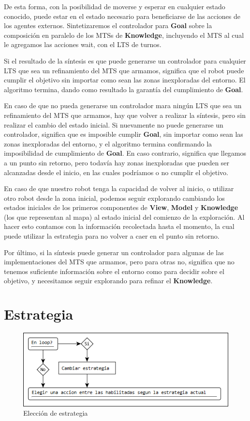 De esta forma, con la posibilidad de moverse y esperar en cualquier estado conocido, puede estar en el estado necesario para beneficiarse de las acciones de 
los agentes externos. Sintetizaremos el controlador para \textbf{Goal} sobre la composición en paralelo de los MTSs de \textbf{Knowledge}, incluyendo el MTS al 
cual le agregamos las acciones wait, con el LTS de turnos.


Si el resultado de la síntesis es que puede generarse un controlador para cualquier LTS que sea un refinamiento del MTS que armamos, significa que el robot 
puede cumplir el objetivo sin importar como sean las zonas inexploradas del entorno. El algoritmo termina, dando como resultado la garantía del cumplimiento 
de \textbf{Goal}.


En caso de que no pueda generarse un controlador mara ningún LTS que sea un refinamiento del MTS que armamos, hay que volver a realizar la síntesis, pero sin 
realizar el cambio del estado inicial. Si nuevamente no puede generarse un controlador, significa que es imposible cumplir \textbf{Goal}, sin importar como sean 
las zonas inexploradas del entorno, y el algoritmo termina confirmando la imposibilidad de cumplimiento de \textbf{Goal}. En caso contrario, significa que 
llegamos a un punto sin retorno, pero todavía hay zonas inexploradas que pueden ser alcanzadas desde el inicio, en las cuales podríamos o no cumplir el objetivo. 


En caso de que nuestro robot tenga la capacidad de volver al inicio, o utilizar otro robot desde la zona inicial, podemos seguir explorando cambiando los 
estados iniciales de los primeros componentes de \textbf{View}, \textbf{Model} y \textbf{Knowledge} (los que representan al mapa) al estado inicial del comienzo 
de la exploración. Al hacer esto contamos con la información recolectada hasta el momento, la cual puede utilizar la estrategia para no volver a caer en el 
punto sin retorno.


Por último, si la síntesis puede generar un controlador para algunas de las implementaciones del MTS que armamos, pero para otras no, significa que no tenemos 
suficiente información sobre el entorno como para decidir sobre el objetivo, y necesitamos seguir explorando para refinar el \textbf{Knowledge}.

\section{Estrategia}

\begin{figure}[H]
  \centering
    \includegraphics[scale=0.75]{Imagenes/Algoritmo/Algoritmo_elegir_1.png}
  \caption{Elección de estrategia}
  \label{fig:Algoritmo_elegir_1}
\end{figure}


